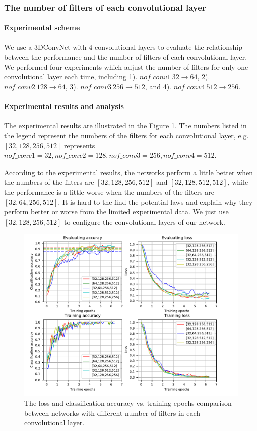 \subsubsection{The number of filters of each convolutional layer}
\paragraph{Experimental scheme}
We use a 3DConvNet with 4 convolutional layers to evaluate the relationship between the performance and the number of filters of each convolutional layer. We performed four experiments which adjust the number of filters for only one convolutional layer each time, including 1). \(nof\_conv1\ 32 \rightarrow 64\), 2). \(nof\_conv2\ 128 \rightarrow 64\), 3). \(nof\_conv3\ 256 \rightarrow 512\), and 4). \(nof\_conv4\ 512 \rightarrow 256\).

\paragraph{Experimental results and analysis}
The experimental results are illustrated in the Figure \ref{fig:plot_nof}. The numbers listed in the legend represent the numbers of the filters for each convolutional layer, e.g. \([32,128,256,512]\) represents \(nof\_conv1 = 32, nof\_conv2 = 128, nof\_conv3 = 256, nof\_conv4 = 512\). 
\par 
According to the experimental results, the networks perform a little better when the numbers of the filters are  \([32,128,256,512]\) and \([32,128,512,512]\), while the performance is a little worse when the numbers of the filters are \([32,64,256,512]\).
It is hard to the find the potential laws and explain why they perform better or worse from the limited experimental data. We just use  \([32,128,256,512]\) to configure the convolutional layers of our network.  
\begin{figure}
	\includegraphics[trim=0cm 0cm 0cm 0cm]{fig01/plot_nof.pdf}
	\caption{The loss and classification accuracy vs. training epochs comparison between networks with different number of filters in each convolutional layer.}
	\label{fig:plot_nof}
\end{figure}




